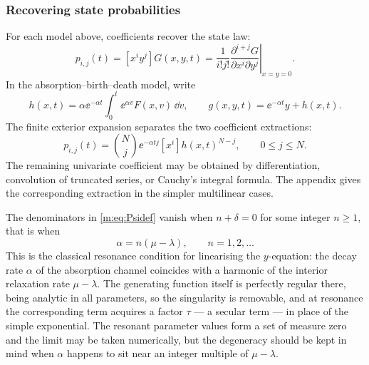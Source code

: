 \subsubsection*{Recovering state probabilities}
For each model above, coefficients recover the state law:
\begin{equation}
 p_{i,j}(t)=[x^iy^j]G(x,y,t)
 =\frac{1}{i!j!}\left.
 \frac{\partial^{i+j}G}{\partial x^i\partial y^j}\right|_{x=y=0}.
 \label{m:eq:bivariate-coefficient}
\end{equation}
In the absorption--birth--death model, write
\[
 h(x,t)=\alpha\ee^{-\alpha t}\int_0^t\ee^{\alpha v}F(x,v)\,\dd v,
 \qquad g(x,y,t)=\ee^{-\alpha t}y+h(x,t).
\]
The finite exterior expansion separates the two coefficient extractions:
\begin{equation}
 p_{i,j}(t)=\binom Nj\ee^{-\alpha tj}[x^i]h(x,t)^{N-j},
 \qquad 0\le j\le N.
 \label{m:eq:abd-coefficient-formula}
\end{equation}
The remaining univariate coefficient may be obtained by differentiation,
convolution of truncated series, or Cauchy's integral formula.  The appendix gives
the corresponding extraction in the simpler multilinear cases.

\begin{remark}[Resonance]
\label{m:rem:resonance}
The denominators in \cref{m:eq:Psidef} vanish when $n+\delta=0$ for some integer
$n\ge1$, that is when
\begin{equation*}
\alpha = n(\mu-\lambda),\qquad n=1,2,\dots
\end{equation*}
This is the classical resonance condition for linearising the $y$-equation: the
decay rate $\alpha$ of the absorption channel coincides with a harmonic of the
interior relaxation rate $\mu-\lambda$. The generating function itself is perfectly
regular there, being analytic in all parameters, so the singularity is removable,
and at resonance the corresponding term acquires a factor $\tau$ --- a secular term
--- in place of the simple exponential. The resonant parameter values form a set of
measure zero and the limit may be taken numerically, but the degeneracy should be
kept in mind when $\alpha$ happens to sit near an integer multiple of $\mu-\lambda$.
\end{remark}

\FloatBarrier
